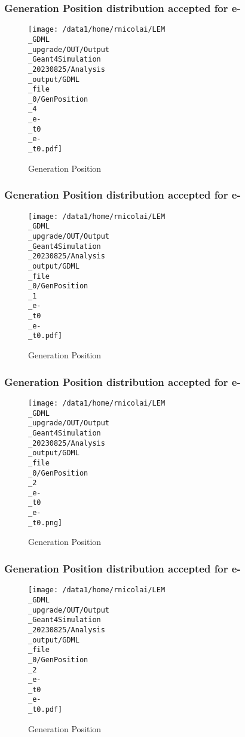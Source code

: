 \documentclass[8pt]{beamer}
\begin{document}
            \begin{frame}
                \frametitle{Generation Position distribution accepted for e-}
            
        \begin{figure}[h]
            \centering
            \texttt{[image: /data1/home/rnicolai/LEM\\\_GDML\\\_upgrade/OUT/Output\\\_Geant4Simulation\\\_20230825/Analysis\\\_output/GDML\\\_file\\\_0/GenPosition\\\_4\\\_e-\\\_t0\\\_e-\\\_t0.pdf]}
            \caption{Generation Position}
        \end{figure}
        
            \end{frame}
            
            \begin{frame}
                \frametitle{Generation Position distribution accepted for e-}
            
        \begin{figure}[h]
            \centering
            \texttt{[image: /data1/home/rnicolai/LEM\\\_GDML\\\_upgrade/OUT/Output\\\_Geant4Simulation\\\_20230825/Analysis\\\_output/GDML\\\_file\\\_0/GenPosition\\\_1\\\_e-\\\_t0\\\_e-\\\_t0.pdf]}
            \caption{Generation Position}
        \end{figure}
        
            \end{frame}
            
            \begin{frame}
                \frametitle{Generation Position distribution accepted for e-}
            
        \begin{figure}[h]
            \centering
            \texttt{[image: /data1/home/rnicolai/LEM\\\_GDML\\\_upgrade/OUT/Output\\\_Geant4Simulation\\\_20230825/Analysis\\\_output/GDML\\\_file\\\_0/GenPosition\\\_2\\\_e-\\\_t0\\\_e-\\\_t0.png]}
            \caption{Generation Position}
        \end{figure}
        
            \end{frame}
            
            \begin{frame}
                \frametitle{Generation Position distribution accepted for e-}
            
        \begin{figure}[h]
            \centering
            \texttt{[image: /data1/home/rnicolai/LEM\\\_GDML\\\_upgrade/OUT/Output\\\_Geant4Simulation\\\_20230825/Analysis\\\_output/GDML\\\_file\\\_0/GenPosition\\\_2\\\_e-\\\_t0\\\_e-\\\_t0.pdf]}
            \caption{Generation Position}
        \end{figure}
        
            \end{frame}
            
\end{document}

